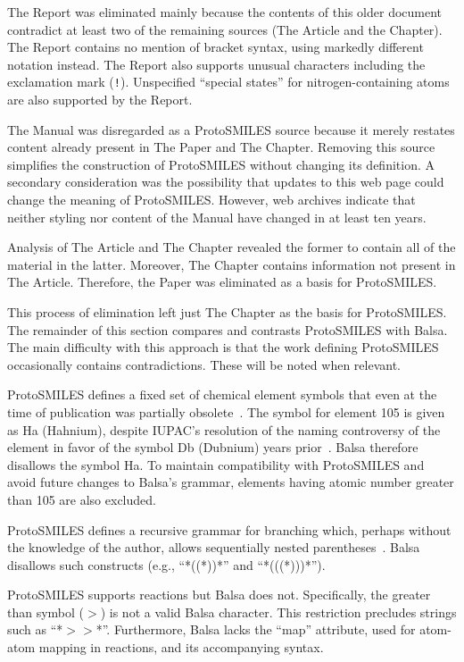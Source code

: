\documentclass{article}
\def\ttt{\texttt}
\begin{document}
The Report was eliminated mainly because the contents of this older document contradict at least two of the remaining sources (The Article and the Chapter). The Report contains no mention of bracket syntax, using markedly different notation instead. The Report also supports unusual characters including the exclamation mark (\ttt{!}). Unspecified \enquote{special states} for nitrogen-containing atoms are also supported by the Report.

The Manual was disregarded as a ProtoSMILES source because it merely restates content already present in The Paper and The Chapter. Removing this source simplifies the construction of ProtoSMILES without changing its definition. A secondary consideration was the possibility that updates to this web page could change the meaning of ProtoSMILES. However, web archives indicate that neither styling nor content of the Manual have changed in at least ten years.

Analysis of The Article and The Chapter revealed the former to contain all of the material in the latter. Moreover, The Chapter contains information not present in The Article. Therefore, the Paper was eliminated as a basis for ProtoSMILES.

This process of elimination left just The Chapter as the basis for ProtoSMILES. The remainder of this section compares and contrasts ProtoSMILES with Balsa. The main difficulty with this approach is that the work defining ProtoSMILES occasionally contains contradictions. These will be noted when relevant.

ProtoSMILES defines a fixed set of chemical element symbols that even at the time of publication was partially obsolete~\cite[p.~83]{weininger:2003}. The symbol for element 105 is given as Ha (Hahnium), despite IUPAC's resolution of the naming controversy of the element in favor of the symbol Db (Dubnium) years prior~\cite{sageson:1997}. Balsa therefore disallows the symbol Ha. To maintain compatibility with ProtoSMILES and avoid future changes to Balsa's grammar, elements having atomic number greater than 105 are also excluded.

ProtoSMILES defines a recursive grammar for branching which, perhaps without the knowledge of the author, allows sequentially nested parentheses~\cite[p.~86]{weininger:2003}. Balsa disallows such constructs (e.g., \enquote{*((*))*} and \enquote{*(((*)))*}).

ProtoSMILES supports reactions but Balsa does not. Specifically, the greater than symbol (\ttt{$>$}) is not a valid Balsa character. This restriction precludes strings such as \enquote{*$>$$>$*}. Furthermore, Balsa lacks the \enquote{map} attribute, used for atom-atom mapping in reactions, and its accompanying syntax.
\end{document}
